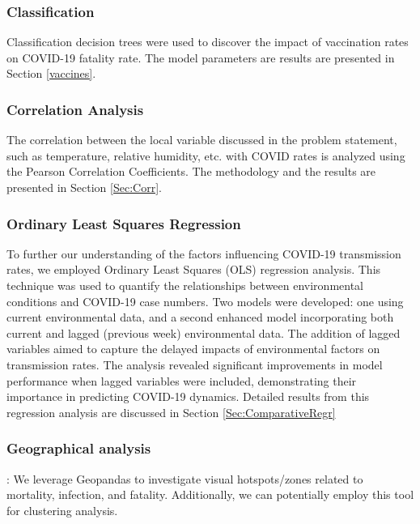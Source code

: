 \documentclass[sigconf,screen,nonacm]{acmart}
\begin{document}
\subsubsection{Classification}
Classification decision trees were used to discover the impact of vaccination rates on COVID-19 fatality rate. The model parameters are results are presented in Section \ref{vaccines}.

\subsubsection{Correlation Analysis}
The correlation between the local variable discussed in the problem statement, such as temperature, relative humidity, etc. with COVID rates is analyzed using the  Pearson Correlation Coefficients. The methodology and the results are presented in Section \ref{Sec:Corr}.

\subsubsection{Ordinary Least Squares Regression}
To further our understanding of the factors influencing COVID-19 transmission rates, we employed Ordinary Least Squares (OLS) regression analysis. This technique was used to quantify the relationships between environmental conditions and COVID-19 case numbers. Two models were developed: one using current environmental data, and a second enhanced model incorporating both current and lagged (previous week) environmental data. The addition of lagged variables aimed to capture the delayed impacts of environmental factors on transmission rates. The analysis revealed significant improvements in model performance when lagged variables were included, demonstrating their importance in predicting COVID-19 dynamics. Detailed results from this regression analysis are discussed in Section \ref{Sec:ComparativeRegr} 

\subsubsection{Geographical analysis}: We leverage Geopandas to investigate visual hotspots/zones related to mortality, infection, and fatality. Additionally, we can potentially employ this tool for clustering analysis. 
\end{document}
